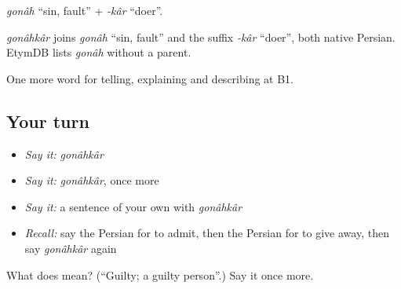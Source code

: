 \emph{gonâh} \textquotedblleft{}sin, fault\textquotedblright{} + \emph{-kâr} \textquotedblleft{}doer\textquotedblright{}.

\begin{cousinweb}
\emph{gonâhkâr} joins \emph{gonâh} \textquotedblleft{}sin, fault\textquotedblright{} and the suffix \emph{-kâr} \textquotedblleft{}doer\textquotedblright{}, both native Persian. EtymDB lists \emph{gonâh} without a parent.
\end{cousinweb}

\begin{grammarlens}[title={What you've built}]
One more word for telling, explaining and describing at B1.
\end{grammarlens}

\subsection*{Your turn}
\begin{itemize}
\raggedright
  \item \emph{Say it:} \emph{gonâhkâr}
  \item \emph{Say it:} \emph{gonâhkâr}, once more
  \item \emph{Say it:} a sentence of your own with \emph{gonâhkâr}
  \item \emph{Recall:} say the Persian for to admit, then the Persian for to give away, then say \emph{gonâhkâr} again
\end{itemize}

\begin{tcolorbox}[breakable,colback=teal!4,colframe=teal!35!black,title={Before you move on}]
What does  mean? (\textquotedblleft{}Guilty; a guilty person\textquotedblright{}.) Say it once more.
\end{tcolorbox}
